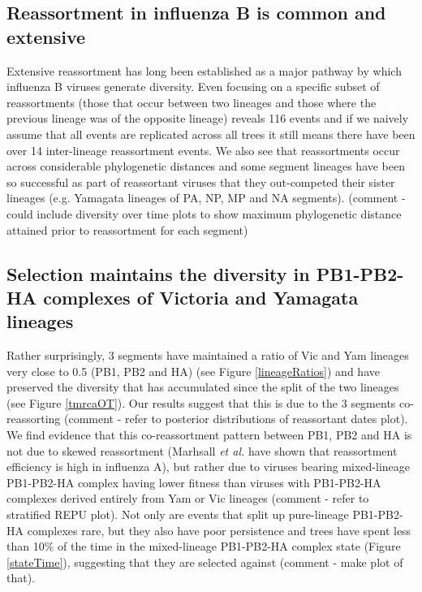 \documentclass[11pt,oneside,letterpaper]{article}
\begin{document}
\subsection*{Reassortment in influenza B is common and extensive}
Extensive reassortment has long been established as a major pathway by which influenza B viruses generate diversity.
Even focusing on a specific subset of reassortments (those that occur between two lineages and those where the previous lineage was of the opposite lineage) reveals 116 events and if we naively assume that all events are replicated across all trees it still means there have been over 14 inter-lineage reassortment events.
We also see that reassortments occur across considerable phylogenetic distances and some segment lineages have been so successful as part of reassortant viruses that they out-competed their sister lineages (e.g. Yamagata lineages of PA, NP, MP and NA segments). (comment - could include diversity over time plots to show maximum phylogenetic distance attained prior to reassortment for each segment)


\subsection*{Selection maintains the diversity in PB1-PB2-HA complexes of Victoria and Yamagata lineages}
Rather surprisingly, 3 segments have maintained a ratio of Vic and Yam lineages very close to 0.5 (PB1, PB2 and HA) (see Figure \ref{lineageRatios}) and have preserved the diversity that has accumulated since the split of the two lineages (see Figure \ref{tmrcaOT}).
Our results suggest that this is due to the 3 segments co-reassorting (comment - refer to posterior distributions of reassortant dates plot).
We find evidence that this co-reassortment pattern between PB1, PB2 and HA is not due to skewed reassortment (Marhsall \textit{et al.} \cite{marshall2013} have shown that reassortment efficiency is high in influenza A), but rather due to viruses bearing mixed-lineage PB1-PB2-HA complex having lower fitness than viruses with PB1-PB2-HA complexes derived entirely from Yam or Vic lineages (comment - refer to stratified REPU plot).
Not only are events that split up pure-lineage PB1-PB2-HA complexes rare, but they also have poor persistence and trees have spent less than 10\% of the time in the mixed-lineage PB1-PB2-HA complex state (Figure \ref{stateTime}), suggesting that they are selected against (comment - make plot of that).
\end{document}
